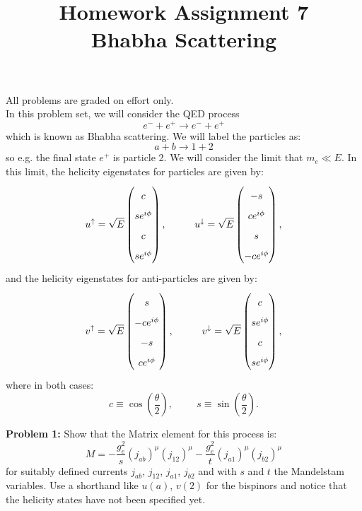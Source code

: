 \documentclass[12pt]{article}
\begin{document}
\date{\vspace{-5ex}}

\title{Homework Assignment 7 \\ Bhabha Scattering }

\maketitle

\noindent
All problems are graded on effort only.\\

In this problem set, we will consider the QED process
$$e^- + e^+ \to e^- + e^+$$
which is known as Bhabha scattering.  We will label the particles as:
$$a + b \to 1 + 2$$
so e.g. the final state $e^+$ is particle 2.
We will consider the limit that $m_e \ll E$.  In this limit, the
helicity eigenstates for particles are given by:
$$\def\arraystretch{1.7}
u^\uparrow = \sqrt{E} \begin{pmatrix} c  \\ s e^{i\phi} \\ c \\ s e^{i\phi} \end{pmatrix}, \hspace{1cm}
u^\downarrow = \sqrt{E} \begin{pmatrix} -s \\ c e^{i\phi} \\ s \\ -c e^{i\phi} \end{pmatrix},
$$
and the helicity eigenstates for anti-particles are given by:
$$\def\arraystretch{1.7}
v^\uparrow = \sqrt{E} \begin{pmatrix} s \\ -c e^{i\phi} \\ -s \\ c e^{i\phi} \end{pmatrix}, \hspace{1cm}
v^\downarrow = \sqrt{E} \begin{pmatrix} c \\  s e^{i\phi} \\  c \\ s e^{i\phi} \end{pmatrix},
$$
where in both cases:
$$c \equiv \cos \left( \frac{\theta}{2} \right), \hspace{1cm } s \equiv \sin \left( \frac{\theta}{2} \right).$$

\newpage

\noindent
{\bf Problem 1:}
Show that the Matrix element for this process is:
$$M = -\frac{g^2_e}{s} (j_{ab})^\mu (j_{12})^\mu
-\frac{g^2_e}{t}(j_{a1})^\mu (j_{b2})^\mu$$ for suitably defined
currents $j_{ab}$, $j_{12}$, $j_{a1}$, $j_{b2}$ and with $s$ and $t$ the
Mandelstam variables.  Use a shorthand like $u(a)$, $v(2)$ for the
bispinors and notice that the helicity states have not been specified yet.\\[5pt]
\end{document}
